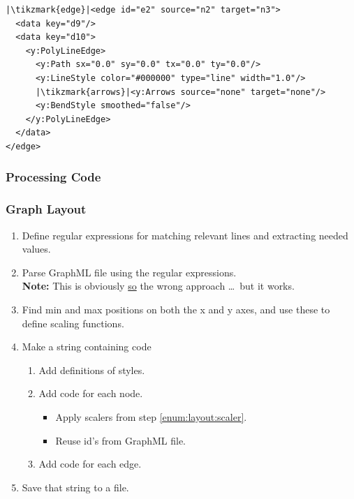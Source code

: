 {\begin{frame}[fragile]
  \begin{verbatim}
|\tikzmark{edge}|<edge id="e2" source="n2" target="n3">
  <data key="d9"/>
  <data key="d10">
    <y:PolyLineEdge>
      <y:Path sx="0.0" sy="0.0" tx="0.0" ty="0.0"/>
      <y:LineStyle color="#000000" type="line" width="1.0"/>
      |\tikzmark{arrows}|<y:Arrows source="none" target="none"/>
      <y:BendStyle smoothed="false"/>
    </y:PolyLineEdge>
  </data>
</edge>
  \end{verbatim}
\end{frame}

\subsubsection{Processing Code}
\begin{frame}[fragile]
  \frametitle{Graph Layout }
  \vspace{3mm}
  \begin{enumerate}
    \pause \item Define regular expressions for matching relevant lines and extracting needed values.
    \pause \item Parse GraphML file using the regular expressions.
          \\
          \pause \textbf{Note:} This is obviously \underline{so} the wrong approach \ldots\ but it works.
    \pause \item \label{enum:layout:scaler} Find min and max positions on both the x and y axes, and use these to define scaling functions.
    \pause \item Make a string containing \TikZ code
      \begin{enumerate}
        \item Add definitions of styles.
        \item Add code for each node.
          \begin{itemize}
            \item Apply scalers from step \ref{enum:layout:scaler}.
            \item Reuse id's from GraphML file.
          \end{itemize}
        \item Add code for each edge.
      \end{enumerate}
    \pause \item Save that string to a file.
  \end{enumerate}
\end{frame}

}
